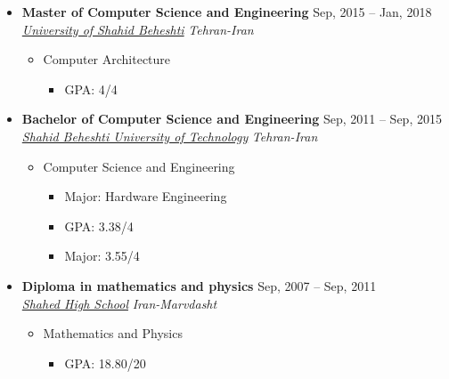 \documentclass[10pt,a4paper,sans]{moderncv} %
\begin{document}
	\begin{itemize}
		\item \textbf{Master of Computer Science and Engineering} \hfill Sep, 2015 -- Jan, 2018 \\ 
		\href{https://sbu.ac.ir/Cols/CSE/Pages/default.aspx/}{ \emph{University of Shahid Beheshti}} \hfill \emph{Tehran-Iran}
		\begin{itemize}
			\item Computer Architecture \hspace{10 pt}  %
			\begin{itemize}
				\item GPA: 4/4 \\
			\end{itemize}
		\end{itemize}
		\vspace{-1 em}
		\item \textbf{Bachelor of Computer Science and Engineering} \hfill Sep, 2011 -- Sep, 2015 \\
		\href{https://sbu.ac.ir/Cols/CSE/Pages/default.aspx/}{ \emph{Shahid Beheshti University of Technology}} \hfill \emph{Tehran-Iran}
		\begin{itemize}
			\item Computer Science and Engineering
			\begin{itemize}		
				\item Major: Hardware Engineering \hspace{10 pt} 
				\item GPA: 3.38/4
				\item Major: 3.55/4
			\end{itemize}
		\end{itemize}

		\item \textbf{Diploma in mathematics and physics} \hfill Sep, 2007 -- Sep, 2011 \\ 
		\href{https://#/}{ \emph{Shahed High School}} \hfill \emph{Iran-Marvdasht}
		\begin{itemize}
			\item Mathematics and Physics \hspace{10 pt}  %
			\begin{itemize}
				\item GPA: 18.80/20 \\
			\end{itemize}
		\end{itemize}
	\end{itemize}
\end{document}
